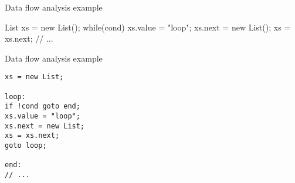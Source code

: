 \documentclass{beamer}
\begin{document}
\begin{frame}[fragile]{Data flow analysis example}
\begin{javacode}
List xs = new List();
while(cond) {
    xs.value = "loop";
    xs.next = new List();
    xs = xs.next;
}
// ...
\end{javacode}
\end{frame}

\begin{frame}[fragile]{Data flow analysis example}
\begin{verbatim}
xs = new List;

loop:
if !cond goto end;
xs.value = "loop";
xs.next = new List;
xs = xs.next;
goto loop;

end:
// ...
\end{verbatim}
\end{frame}
\end{document}
